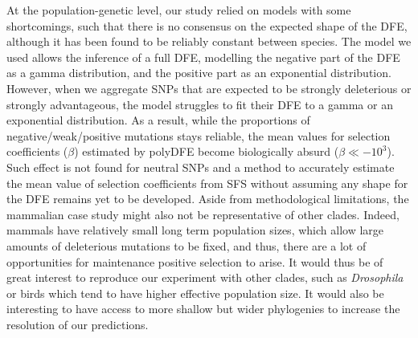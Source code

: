 \documentclass{article}
\newcommand{\Spop}{\beta}
\begin{document}

    At the population-genetic level, our study relied on models with some shortcomings, such that there is no consensus on the expected shape of the DFE\cite{welch_divergence_2008, bataillon_effects_2014}, although it has been found to be reliably constant between species\cite{castellano_comparison_2019}.
    The model we used allows the inference of a full DFE, modelling the negative part of the DFE as a gamma distribution, and the positive part as an exponential distribution.
    However, when we aggregate SNPs that are expected to be strongly deleterious or strongly advantageous, the model struggles to fit their DFE to a gamma or an exponential distribution.\cite{brevet_reconstructing_2021}
    As a result, while the proportions of negative/weak/positive mutations stays reliable, the mean values for selection coefficients ($\Spop$) estimated by polyDFE become biologically absurd ($\Spop \ll -10^3$).
    Such effect is not found for neutral SNPs and a method to accurately estimate the mean value of selection coefficients from SFS without assuming any shape for the DFE remains yet to be developed.
    Aside from methodological limitations, the mammalian case study might also not be representative of other clades.
    Indeed, mammals have relatively small long term population sizes, which allow large amounts of deleterious mutations to be fixed, and thus, there are a lot of opportunities for maintenance positive selection to arise.
    It would thus be of great interest to reproduce our experiment with other clades, such as \textit{Drosophila} or birds which tend to have higher effective population size.
    It would also be interesting to have access to more shallow but wider phylogenies to increase the resolution of our predictions.
\end{document}
